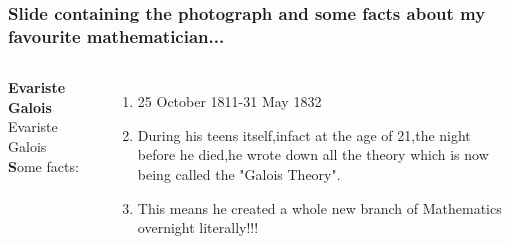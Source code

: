 \documentclass{beamer}
\begin{document}
\begin{frame}
\frametitle{Slide containing the photograph and some facts about my favourite mathematician...}
\begin{columns}[c]
\column{5cm}
\textbf {Evariste Galois}
\column{7cm}
\Large Evariste Galois\\
 \normalsize
\textbf Some facts:
\begin{enumerate}
\item 25 October 1811-31 May 1832\\
\item During his teens itself,infact at the age of 21,the night before he died,he wrote down all the theory which is now being called the "Galois Theory".\\   
\item This means he created a whole new branch of Mathematics overnight literally!!!\\
\end{enumerate}
\end{columns}
\end{frame}
\end{document}
